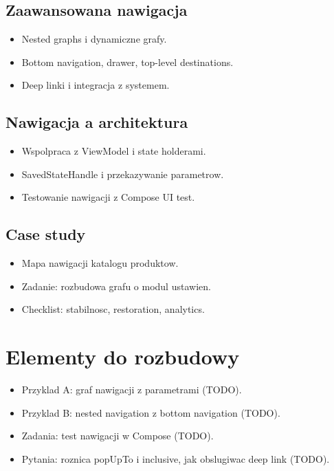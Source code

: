 \subsection{Zaawansowana nawigacja}
\begin{itemize}
  \item Nested graphs i dynamiczne grafy.
  \item Bottom navigation, drawer, top-level destinations.
  \item Deep linki i integracja z systemem.
\end{itemize}

\subsection{Nawigacja a architektura}
\begin{itemize}
  \item Wspolpraca z ViewModel i state holderami.
  \item SavedStateHandle i przekazywanie parametrow.
  \item Testowanie nawigacji z Compose UI test.
\end{itemize}

\subsection{Case study}
\begin{itemize}
  \item Mapa nawigacji katalogu produktow.
  \item Zadanie: rozbudowa grafu o modul ustawien.
  \item Checklist: stabilnosc, restoration, analytics.
\end{itemize}

\section{Elementy do rozbudowy}
\begin{itemize}
  \item Przyklad A: graf nawigacji z parametrami (TODO).
  \item Przyklad B: nested navigation z bottom navigation (TODO).
  \item Zadania: test nawigacji w Compose (TODO).
  \item Pytania: roznica popUpTo i inclusive, jak obslugiwac deep link (TODO).
\end{itemize}


